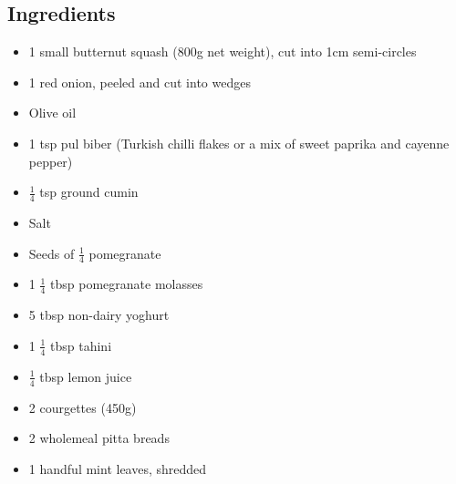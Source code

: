 \documentclass{book}
\begin{document}
\subsection*{Ingredients}
\begin{itemize}
\item 1 small butternut squash (800g net weight), cut into 1cm semi-circles 
\item 1 red onion, peeled and cut into wedges 
\item Olive oil 
\item 1 tsp pul biber (Turkish chilli flakes or a mix of sweet paprika and cayenne pepper) 
\item $\frac{1}{4}$ tsp ground cumin 
\item Salt
\item Seeds of $\frac{1}{4}$ pomegranate 
\item 1 $\frac{1}{4}$ tbsp pomegranate molasses 
\item 5 tbsp non-dairy yoghurt
\item 1 $\frac{1}{4}$ tbsp tahini
\item $\frac{1}{4}$ tbsp lemon juice
\item 2 courgettes (450g)
\item 2 wholemeal pitta breads
\item 1 handful mint leaves, shredded
\end{itemize}
\end{document}
